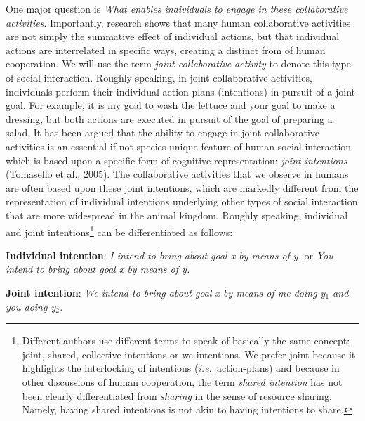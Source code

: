 \documentclass{article}
\newcommand{\ie}{{\textit{i.e.~}}}
\begin{document}
One major question is \emph{What enables individuals to engage in these collaborative
activities}. Importantly, research shows that many human collaborative
activities are not simply the summative effect of individual actions, but that
individual actions are interrelated in specific ways, creating a distinct from
of human cooperation. We will use the term \emph{joint collaborative activity}
to denote this type of social interaction. Roughly speaking, in joint
collaborative activities, individuals perform their individual action-plans
(intentions) in pursuit of a joint goal. For example, it is my goal to wash the
lettuce and your goal to make a dressing, but both actions are executed in
pursuit of the goal of preparing a salad. It has been argued that the ability
to engage in joint collaborative activities is an essential if not
species-unique feature of human social interaction which is based upon a
specific form of cognitive representation: \emph{joint intentions} (Tomasello et al.,
2005). The collaborative activities that we observe in humans are often based
upon these joint intentions, which are markedly different from the
representation of individual intentions underlying other types of social
interaction that are more widespread in the animal kingdom. Roughly speaking,
individual and joint intentions\footnote{Different authors use different terms
to speak of basically the same concept: joint, shared, collective intentions or
we-intentions. We prefer joint because it highlights the interlocking of
intentions (\ie action-plans) and because in other discussions of human
cooperation, the term \textit{shared intention} has not been clearly differentiated
from \textit{sharing} in the sense of resource sharing. Namely, having shared
intentions is not akin to having intentions to share.\par } can be
differentiated as follows:

{\bf Individual intention}:
{\it I intend to bring about goal x by means of y.} or {\it You intend to bring about goal x by means of y.}

{\bf Joint intention}:
{\it We intend to bring about goal x by means of me doing y$_1$ and you
doing y$_2$.}
\end{document}
